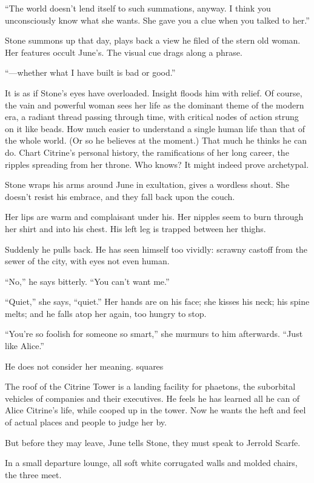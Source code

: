 “The world doesn’t lend itself to such summations, anyway. I think you unconsciously know what she wants. She gave you a clue when you talked to her.”

Stone summons up that day, plays back a view he filed of the stern old woman. Her features occult June’s. The visual cue drags along a phrase.

“—whether what I have built is bad or good.”

It is as if Stone’s eyes have overloaded. Insight floods him with relief. Of course, the vain and powerful woman sees her life as the dominant theme of the modern era, a radiant thread passing through time, with critical nodes of action strung on it like beads. How much easier to understand a single human life than that of the whole world. (Or so he believes at the moment.) That much he thinks he can do. Chart Citrine’s personal history, the ramifications of her long career, the ripples spreading from her throne. Who knows? It might indeed prove archetypal.

Stone wraps his arms around June in exultation, gives a wordless shout. She doesn’t resist his embrace, and they fall back upon the couch.

Her lips are warm and complaisant under his. Her nipples seem to burn through her shirt and into his chest. His left leg is trapped between her thighs.

Suddenly he pulls back. He has seen himself too vividly: scrawny castoff from the sewer of the city, with eyes not even human.

“No,” he says bitterly. “You can’t want me.”

“Quiet,” she says, “quiet.” Her hands are on his face; she kisses his neck; his spine melts; and he falls atop her again, too hungry to stop.

“You’re so foolish for someone so smart,” she murmurs to him afterwards. “Just like Alice.”

He does not consider her meaning.
squares

The roof of the Citrine Tower is a landing facility for phaetons, the suborbital vehicles of companies and their executives. He feels he has learned all he can of Alice Citrine’s life, while cooped up in the tower. Now he wants the heft and feel of actual places and people to judge her by.

But before they may leave, June tells Stone, they must speak to Jerrold Scarfe.

In a small departure lounge, all soft white corrugated walls and molded chairs, the three meet.


